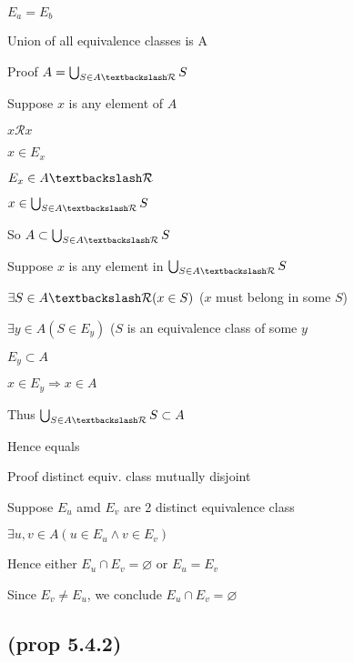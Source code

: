 \documentclass[12pt]{article}
\begin{document}
\begin{spacing}{1.5}
\begin{enumerate*}
\begin{enumerate*}
			\item $E_a = E_b$
		\end{enumerate*}
	\item Union of all equivalence classes is A
		\begin{enumerate*}
			\item Proof $A = \bigcup_{S \in A \textbackslash \mathcal{R}} S$
			\begin{enumerate*}
				\item Suppose $x$ is any element of $A$
				\item $x \mathcal{R} x$
				\item $x \in E_x$
				\item $E_x \in A \textbackslash \mathcal{R}$
				\item $x \in \bigcup_{S \in A \textbackslash \mathcal{R}} S$
				\item So $A \subset \bigcup_{S \in A \textbackslash \mathcal{R}} S$
				\item Suppose $x$ is any element in $\bigcup_{S \in A \textbackslash \mathcal{R}} S$
				\item $\exists S \in A \textbackslash \mathcal{R} (x \in S)$ ($x$ must belong in some $S$)
				\item $\exists y \in A (S \in E_y)$ ($S$ is an equivalence class of some $y$
				\item $E_y \subset A$
				\item $x \in E_y \Rightarrow x \in A$
				\item Thus $\bigcup_{S \in A \textbackslash \mathcal{R}} S \subset A$
				\item Hence equals
			\end{enumerate*}
			
			\item Proof distinct equiv. class mutually disjoint
			\begin{enumerate*}
				\item Suppose $E_u$ amd $E_v$ are 2 distinct equivalence class
				\item $\exists u, v \in A (u \in E_u \wedge v \in E_v)$
				\item Hence either $E_u \cap E_v = \varnothing$ or $E_u = E_v$
				\item Since $E_v \neq E_u$, we conclude $E_u \cap E_v = \varnothing$ 
			\end{enumerate*}
		\end{enumerate*}
\end{enumerate*}

\subsection{(prop 5.4.2)}


\end{spacing}
\end{document}
